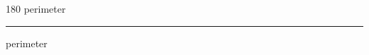 
\begin{frame}
\begin{center}
\begin{turn}{180}
{\fontsize{2.5cm}{1em}\selectfont perimeter}
\end{turn}
\vspace{1em}\par  
\hrule
\vspace{1em}\par  
{\fontsize{2.5cm}{1em}\selectfont perimeter}
\end{center}
\end{frame}
